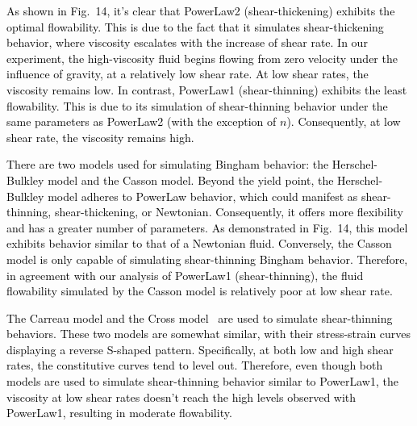 \documentclass[10pt,journal,compsoc]{IEEEtran}
\newcommand{\revised}[1]{{\textcolor{black}{#1}}}
\begin{document}

\revised{As shown in Fig.~14, it's clear that PowerLaw2 (shear-thickening) exhibits the optimal flowability. This is due to the fact that it simulates shear-thickening behavior, where viscosity escalates with the increase of shear rate. In our experiment, the high-viscosity fluid begins flowing from zero velocity under the influence of gravity, at a relatively low shear rate. At low shear rates, the viscosity remains low. }
\revised{In contrast, PowerLaw1 (shear-thinning) exhibits the least flowability. This is due to its simulation of shear-thinning behavior under the same parameters as PowerLaw2 (with the exception of $n$). Consequently, at low shear rate, the viscosity remains high.}

\revised{There are two models used for simulating Bingham behavior: the Herschel-Bulkley model and the Casson model. Beyond the yield point, the Herschel-Bulkley model adheres to PowerLaw behavior, which could manifest as shear-thinning, shear-thickening, or Newtonian. Consequently, it offers more flexibility and has a greater number of parameters. As demonstrated in Fig.~14, this model exhibits behavior similar to that of a Newtonian fluid. Conversely, the Casson model is only capable of simulating shear-thinning Bingham behavior. Therefore, in agreement with our analysis of PowerLaw1 (shear-thinning), the fluid flowability simulated by the Casson model is relatively poor at low shear rate.}

\revised{The Carreau model and the Cross model~\cite{Cross1965} are used to simulate shear-thinning behaviors. These two models are somewhat similar, with their stress-strain curves displaying a reverse S-shaped pattern. Specifically, at both low and high shear rates, the constitutive curves tend to level out. Therefore, even though both models are used to simulate shear-thinning behavior similar to PowerLaw1, the viscosity at low shear rates doesn't reach the high levels observed with PowerLaw1, resulting in moderate flowability.}
\end{document}
